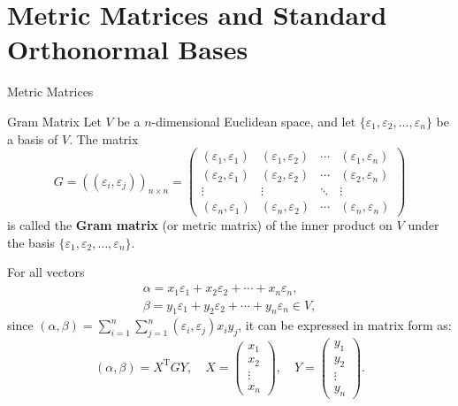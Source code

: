 \documentclass[11pt]{../../TexTemplate/elegantbook} %
\begin{document}
\section{Metric Matrices and Standard Orthonormal Bases}
\begin{leftbarTitle}{Metric Matrices}\end{leftbarTitle}
\begin{definition}{Gram Matrix}
    Let \( V \) be a \(n\)-dimensional Euclidean space, 
    and let \( \{\varepsilon_1, \varepsilon_2, \dots, \varepsilon_n\} \) be a basis of \( V \).
    The matrix
    \[
    G = ((\varepsilon_i, \varepsilon_j))_{n \times n} =
    \begin{pmatrix}
        (\varepsilon_1, \varepsilon_1) & (\varepsilon_1, \varepsilon_2) & \cdots & (\varepsilon_1, \varepsilon_n) \\
        (\varepsilon_2, \varepsilon_1) & (\varepsilon_2, \varepsilon_2) & \cdots & (\varepsilon_2, \varepsilon_n) \\
        \vdots & \vdots & \ddots & \vdots \\
        (\varepsilon_n, \varepsilon_1) & (\varepsilon_n, \varepsilon_2) & \cdots & (\varepsilon_n, \varepsilon_n)
    \end{pmatrix}
    \]
    is called the \textbf{Gram matrix} (or metric matrix) of the inner product on \( V \)
    under the basis \( \{\varepsilon_1, \varepsilon_2, \dots, \varepsilon_n\} \).
\end{definition}

For all vectors
\begin{gather*}
    \alpha = x_{1}\varepsilon_{1}+x_{2}\varepsilon_{2}+\cdots+x_{n}\varepsilon_{n},  \\
    \beta = y_{1}\varepsilon_{1}+y_{2}\varepsilon_{2}+\cdots+y_{n}\varepsilon_{n} \in V ,
\end{gather*}
since \(( \alpha, \beta)=\sum_{i=1}^{n} \sum_{j=1}^{n}  (\varepsilon_i, \varepsilon_j)x_{i}y_{j} \), 
it can be expressed in matrix form as:
\[
( \alpha, \beta) = X^{\mathrm{T}} G Y, \quad
X = \begin{pmatrix} x_1 \\ x_2 \\ \vdots \\ x_n \end{pmatrix}, \quad
Y = \begin{pmatrix} y_1 \\ y_2 \\ \vdots \\ y_n \end{pmatrix}.
\]
\end{document}
